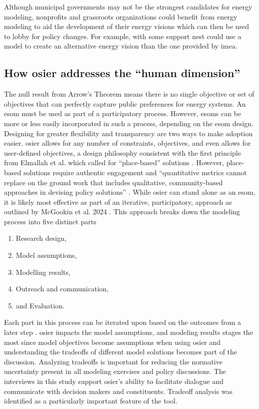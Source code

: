 Although municipal governments may not be the strongest candidates for energy
modeling, nonprofits and grassroots organizations could benefit from energy
modeling to aid the development of their energy visions which can then be used
to lobby for policy changes. For example, with some support \ac{nest} could use
a model to create an alternative energy vision than the one provided by
\ac{imea}.

\subsection{How \ac{osier} addresses the ``human dimension''} 

The null result from Arrow's Theorem means there is no single objective or set
of objectives that can perfectly capture public preferences for energy systems.
An \ac{esom} must be used as part of a participatory process. However,
\acp{esom} can be more or less easily incorporated in such a process, depending
on the \ac{esom} design. Designing for greater flexibility and transparency are
two ways to make adoption easier. \ac{osier} allows for any number of
constraints, objectives, and even allows for user-defined objectives, a design
philosophy consistent with the first principle from Elmallah et al. which called
for ``place-based'' solutions \cite{elmallah_frontlining_2022}. However,
place-based solutions require authentic engagement and ``quantitative metrics
cannot replace on the ground work that includes qualitative, community-based
approaches in devising policy solutions'' \cite{elmallah_frontlining_2022}.
While \ac{osier} can stand alone as an \ac{esom}, it is likely most effective as
part of an iterative, participatory, approach as outlined by McGookin et al.
2024 \cite{mcgookin_advancing_2024}. This approach breaks down the modeling
process into five distinct parts
\begin{enumerate}
    \item Research design,
    \item Model assumptions,
    \item Modelling results,
    \item Outreach and communication,
    \item and Evaluation.
\end{enumerate}
Each part in this process can be iterated upon based on the outcomes from a
later step \cite{mcgookin_advancing_2024}. \ac{osier} impacts the model
assumptions, and modeling results stages the most since model objectives become
assumptions when using \ac{osier} and understanding the tradeoffs of different
model solutions becomes part of the discussion. Analyzing tradeoffs is important
for reducing the normative uncertainty present in all modeling exercises and
policy discussions. The interviews in this study support \ac{osier}'s ability to
facilitate dialogue and communicate with decision makers and constituents.
Tradeoff analysis was identified as a particularly important feature of the
tool.

